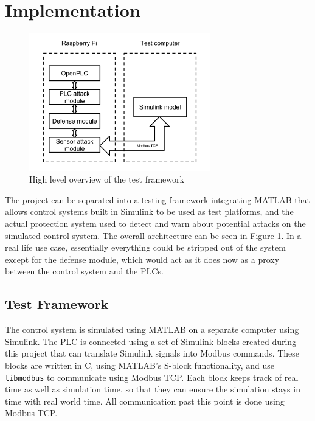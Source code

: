 \documentclass[10pt,twocolumn]{IEEEtran}
\begin{document}
\section{Implementation} \label{sec:impl}
\begin{figure}
  \centering
  \includegraphics[width=0.7\textwidth]{csaw2017architecture.png}
  \caption{High level overview of the test framework}
  \label{fig:arch}
\end{figure}

The project can be separated into a testing framework integrating MATLAB that allows control systems built in Simulink to be used as test platforms, and the actual protection system used to detect and warn about potential attacks on the simulated control system.
The overall architecture can be seen in Figure \ref{fig:arch}.
In a real life use case, essentially everything could be stripped out of the system except for the defense module, which would act as it does now as a proxy between the control system and the PLCs.

\subsection{Test Framework} \label{sec:test}
The control system is simulated using MATLAB on a separate computer using Simulink.
The PLC is connected using a set of Simulink blocks created during this project that can translate Simulink signals into Modbus commands.
These blocks are written in C, using MATLAB's S-block functionality, and use \texttt{libmodbus} to communicate using Modbus TCP.
Each block keeps track of real time as well as simulation time, so that they can ensure the simulation stays in time with real world time.
All communication past this point is done using Modbus TCP.
\end{document}
